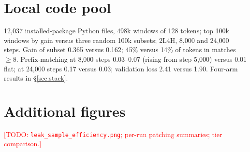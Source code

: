 \documentclass[11pt]{article}
\newcommand{\todo}[1]{\textcolor{red}{[TODO: #1]}}
\begin{document}
\section{Local code pool}\label{app:local}
12,037 installed-package Python files, 498k windows of 128 tokens; top
100k windows by gain versus three random 100k subsets; 2L4H, 8,000 and
24,000 steps. Gain of subset 0.365 versus 0.162; 45\% versus 14\% of tokens
in matches $\geq8$. Prefix-matching at 8,000 steps 0.03--0.07 (rising from
step 5,000) versus 0.01 flat; at 24,000 steps 0.17 versus 0.03; validation
loss 2.41 versus 1.90. Four-arm results in \S\ref{sec:stack}.

\section{Additional figures}
\todo{\texttt{leak\_sample\_efficiency.png}; per-run patching summaries;
tier comparison.}
\end{document}
